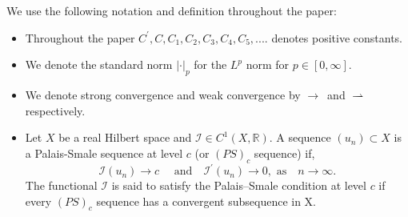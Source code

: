 \documentclass[reqno]{amsart}
\newcommand{\Om}{\Omega}
\newcommand{\weak}{\rightharpoonup}
\newcommand{\noi} {  \noindent}
\newcommand{\mb} {\mathbb}
\newcommand{\mc} {\mathcal}
\numberwithin{theorem}{section} \numberwithin{equation}{section}
\begin{document}
\noi We use the following notation and definition throughout the paper:
\begin{itemize}
    \item Throughout the paper $ C^{\prime}, C, C_1, C_2, C_3, C_4, C_5,....$ denotes positive constants.\\
    \item We denote the standard norm $|\cdot|_p$ for the $L^p$ norm for $p\in [0, \infty]$.\\
    \item  We denote strong convergence and weak convergence by $\to$\ and $\weak$ respectively. 
    \item Let $X$ be a real Hilbert space and $\mc{I}\in C^1(X, \mb{R})$. A sequence $(u_n)\subset X$ is a Palais-Smale sequence at level $c$ (or $(PS)_c$ sequence) if, \[\mc{I}(u_n) \to c \quad \text{ and} \quad \mc{I}^{\prime}(u_n) \to 0, \text{ as} \quad n\to \infty.\] 
\noi The functional $\mc{I}$ is said to satisfy the Palais–Smale condition at level $c$ if every $(PS)_c$ sequence has a convergent subsequence in X.
\end{itemize}
\end{document}
